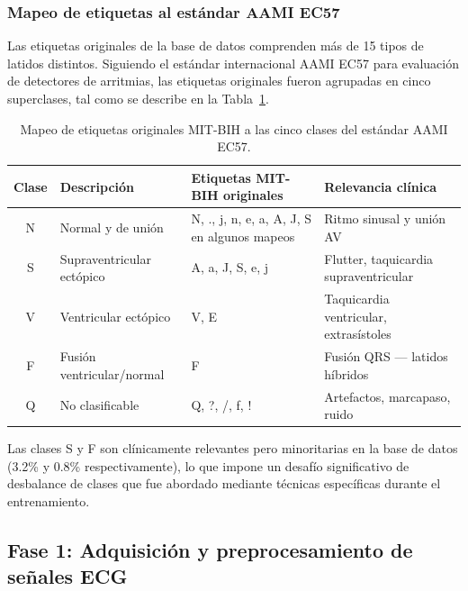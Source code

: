 \subsubsection{Mapeo de etiquetas al estándar AAMI EC57}

Las etiquetas originales de la base de datos comprenden más de 15 tipos de latidos distintos. Siguiendo el estándar internacional AAMI EC57 \cite{AAMI2012} para evaluación de detectores de arritmias, las etiquetas originales fueron agrupadas en cinco superclases, tal como se describe en la Tabla~\ref{T_aami}.

\begin{table}[h]
\caption{Mapeo de etiquetas originales MIT-BIH a las cinco clases del estándar AAMI EC57.}
\label{T_aami}
\begin{center}
\begin{tabular}{clll}
\hline
\textbf{Clase} & \textbf{Descripción} & \textbf{Etiquetas MIT-BIH originales} & \textbf{Relevancia clínica} \\ \hline
N & Normal y de unión         & N, ., j, n, e, a, A, J, S en algunos mapeos & Ritmo sinusal y unión AV \\
S & Supraventricular ectópico & A, a, J, S, e, j                             & Flutter, taquicardia supraventricular \\
V & Ventricular ectópico      & V, E                                         & Taquicardia ventricular, extrasístoles \\
F & Fusión ventricular/normal & F                                            & Fusión QRS — latidos híbridos \\
Q & No clasificable           & Q, ?, /, f, !                                & Artefactos, marcapaso, ruido \\
\hline
\end{tabular}
\end{center}
\end{table}

Las clases S y F son clínicamente relevantes pero minoritarias en la base de datos (3.2\% y 0.8\% respectivamente), lo que impone un desafío significativo de desbalance de clases que fue abordado mediante técnicas específicas durante el entrenamiento.

\subsection{Fase 1: Adquisición y preprocesamiento de señales ECG}

